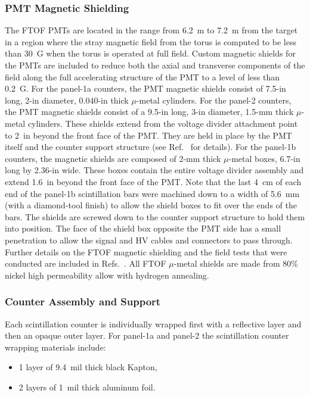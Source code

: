 \documentclass[final,3p,twocolumn]{elsarticle}
\begin{document}
\subsubsection{PMT Magnetic Shielding}

The FTOF PMTs are located in the range from 6.2~m to 7.2~m from the target in a region where the
stray magnetic field from the torus is computed to be less than 30~G when the torus is operated at full
field. Custom magnetic shields for the PMTs are included to reduce both the axial and transverse
components of the field along the full accelerating structure of the PMT to a level of less than 0.2~G.
For the panel-1a counters, the PMT magnetic shields consist of 7.5-in long, 2-in diameter, 0.040-in thick
$\mu$-metal cylinders. For the panel-2 counters, the PMT magnetic shields consist of a 9.5-in long, 3-in
diameter, 1.5-mm thick $\mu$-metal cylinders. These shields extend from the voltage divider attachment
point to 2~in beyond the front face of the PMT. They are held in place by the PMT itself and the counter
support structure (see Ref.~\cite{tof-nim} for details).  For the panel-1b counters, the magnetic shields
are composed of 2-mm thick $\mu$-metal boxes, 6.7-in long by 2.36-in wide. These boxes contain the
entire voltage divider assembly and extend 1.6~in beyond the front face of the PMT. Note that the last
4~cm of each end of the panel-1b scintillation bars were machined down to a width of 5.6~mm (with a
diamond-tool finish) to allow the shield boxes to fit over the ends of the bars. The shields are screwed
down to the counter support structure to hold them into position. The face of the shield box opposite the
PMT side has a small penetration to allow the signal and HV cables and connectors to pass through. Further
details on the FTOF magnetic shielding and the field tests that were conducted are included in
Refs.~\cite{nim-p1b,ftof-shields}. All FTOF $\mu$-metal shields are made from 80\% nickel high
permeability allow with hydrogen annealing.

\subsubsection{Counter Assembly and Support}

Each scintillation counter is individually wrapped first with a reflective layer and then an opaque outer layer.
For panel-1a and panel-2 the scintillation counter wrapping materials include:

\begin{itemize}
\item 1 layer of 9.4~mil thick black Kapton,
\item 2 layers of 1~mil thick aluminum foil.
\end{itemize}
\end{document}
